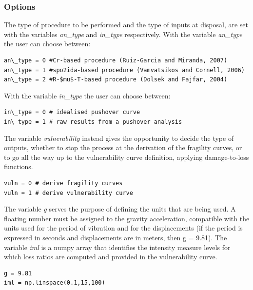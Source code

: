 \subsubsection{Options}
\label{subsubsec:options}
The type of procedure to be performed and the type of inputs at disposal, are set with the variables \textit{an\_type} and \textit{in\_type} respectively. With the variable \textit{an\_type} the user can choose between:

\begin{Verbatim}[frame=single, commandchars=\\\{\}, samepage=true]
an\_type = 0 #Cr-based procedure (Ruiz-Garcia and Miranda, 2007)
an\_type = 1 #spo2ida-based procedure (Vamvatsikos and Cornell, 2006)
an\_type = 2 #R-$mu$-T-based procedure (Dolsek and Fajfar, 2004)
\end{Verbatim}

With the variable \textit{in\_type} the user can choose between:

\begin{Verbatim}[frame=single, commandchars=\\\{\}, samepage=true]
in\_type = 0 # idealised pushover curve
in\_type = 1 # raw results from a pushover analysis
\end{Verbatim}

The variable \textit{vulnerability} instead gives the opportunity to decide the type of outputs, whether to stop the process at the derivation of the fragility curves, or to go all the way up to the vulnerability curve definition, applying damage-to-loss functions.

\begin{Verbatim}[frame=single, commandchars=\\\{\}, samepage=true]
vuln = 0 # derive fragility curves 
vuln = 1 # derive vulnerability curve
\end{Verbatim}

The variable \textit{g} serves the purpose of defining the units that are being used. A floating number must be assigned to the gravity acceleration, compatible with the units used for the period of vibration and for the displacements (if the period is expressed in seconds and displacements are in meters, then g = 9.81). The variable \textit{iml} is a numpy array that identifies the intensity measure levels for which loss ratios are computed and provided in the vulnerability curve.

\begin{Verbatim}[frame=single, commandchars=\\\{\}, samepage=true]
g = 9.81
iml = np.linspace(0.1,15,100)
\end{Verbatim}

